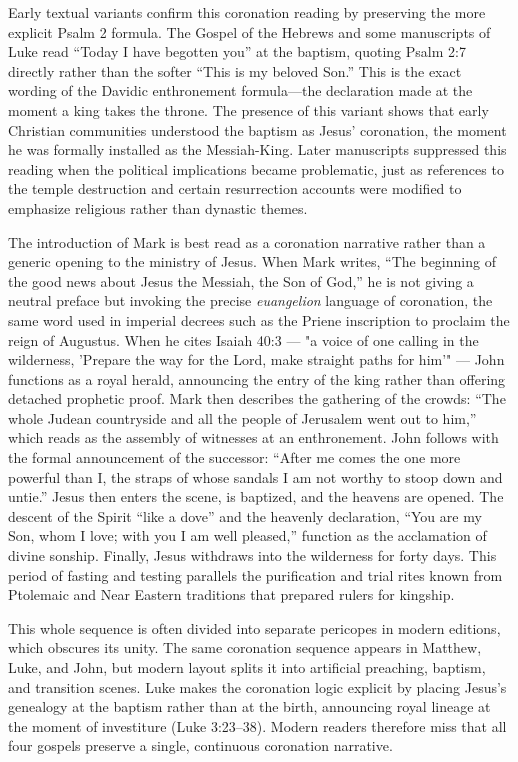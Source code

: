 Early textual variants confirm this coronation reading by preserving the more explicit Psalm 2 formula.
The Gospel of the Hebrews \cite{gospelhebrews} and some manuscripts of Luke read ``Today I have begotten you'' at the baptism, quoting Psalm 2:7 directly rather than the softer ``This is my beloved Son.''
This is the exact wording of the Davidic enthronement formula---the declaration made at the moment a king takes the throne.
The presence of this variant shows that early Christian communities understood the baptism as Jesus' coronation, the moment he was formally installed as the Messiah-King.
Later manuscripts suppressed this reading when the political implications became problematic, just as references to the temple destruction and certain resurrection accounts were modified to emphasize religious rather than dynastic themes.

The introduction of Mark is best read as a coronation narrative rather than a generic opening to the ministry of Jesus.
When Mark writes, “The beginning of the good news about Jesus the Messiah, the Son of God,” he is not giving a neutral preface but invoking the precise \textit{euangelion} language of coronation, the same word used in imperial decrees such as the Priene inscription \cite[458]{dittenberger:ogis} to proclaim the reign of Augustus.
When he cites Isaiah 40:3 --- "a voice of one calling in the wilderness, 'Prepare the way for the Lord, make straight paths for him'" --- John functions as a royal herald, announcing the entry of the king rather than offering detached prophetic proof.
Mark then describes the gathering of the crowds: “The whole Judean countryside and all the people of Jerusalem went out to him,” which reads as the assembly of witnesses at an enthronement.
John follows with the formal announcement of the successor: “After me comes the one more powerful than I, the straps of whose sandals I am not worthy to stoop down and untie.”
Jesus then enters the scene, is baptized, and the heavens are opened.
The descent of the Spirit “like a dove” and the heavenly declaration, “You are my Son, whom I love; with you I am well pleased,” function as the acclamation of divine sonship.
Finally, Jesus withdraws into the wilderness for forty days.
This period of fasting and testing parallels the purification and trial rites known from Ptolemaic and Near Eastern traditions that prepared rulers for kingship.

This whole sequence is often divided into separate pericopes in modern editions, which obscures its unity.
The same coronation sequence appears in Matthew, Luke, and John, but modern layout splits it into artificial preaching, baptism, and transition scenes.
Luke makes the coronation logic explicit by placing Jesus's genealogy at the baptism rather than at the birth, announcing royal lineage at the moment of investiture (Luke 3:23--38).
Modern readers therefore miss that all four gospels preserve a single, continuous coronation narrative.

